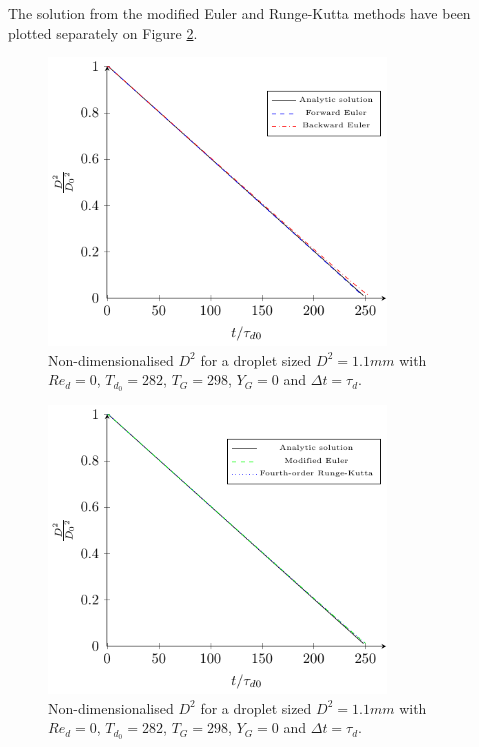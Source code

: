 \documentclass[../Interim_Report_Master]{subfiles}
\begin{document}
The solution from the modified Euler and Runge-Kutta methods have been plotted separately on Figure \ref{diameter_squared_time_2_tau}.
\begin{figure}[H]
	\centering
	\includegraphics[width=0.8\textwidth]{./Diagrams/Uncoupled_D2_Transfer_tau/Uncoupled_D2_Transfer_tau.pdf}
	\caption{Non-dimensionalised $D^2$ for a droplet sized $D^2=1.1mm$ with $Re_d=0$, $T_{d_0}=282$, $T_G=298$, $Y_G=0$ and $\Delta t=\tau_d$.}
	\label{diameter_squared_time_tau}
\end{figure}

\begin{figure}[H]
	\centering
	\includegraphics[width=0.8\textwidth]{./Diagrams/Uncoupled_D2_Transfer_tau/Uncoupled_D2_Transfer_2_tau.pdf}
	\caption{Non-dimensionalised $D^2$ for a droplet sized $D^2=1.1mm$ with $Re_d=0$, $T_{d_0}=282$, $T_G=298$, $Y_G=0$ and $\Delta t=\tau_d$.}
	\label{diameter_squared_time_2_tau}
\end{figure}
\end{document}
